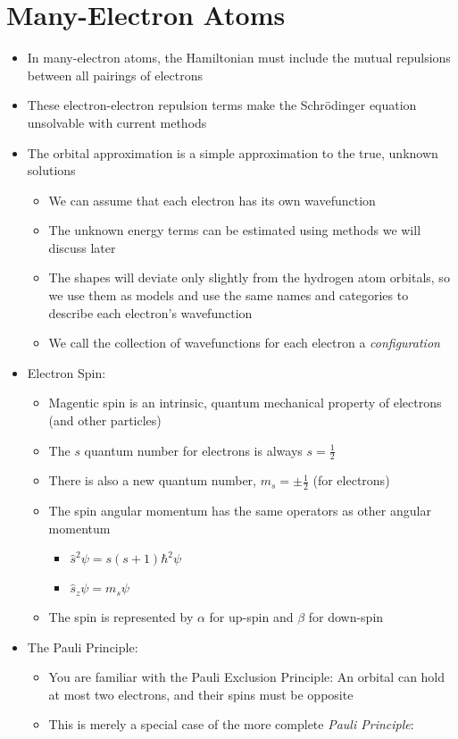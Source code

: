 \documentclass[12pt, openany, letterpaper]{memoir}
\begin{document}
\section{Many-Electron Atoms}
\begin{itemize}
	\item In many-electron atoms, the Hamiltonian must include the mutual repulsions between all pairings of electrons
	\item These electron-electron repulsion terms make the Schr\"odinger equation unsolvable with current methods
	\item The orbital approximation is a simple approximation to the true, unknown solutions
	\begin{itemize}
		\item We can assume that each electron has its own wavefunction
		\item The unknown energy terms can be estimated using methods we will discuss later 
		\item The shapes will deviate only slightly from the hydrogen atom orbitals, so we use them as models and use the same names and categories to describe each electron's wavefunction
		\item We call the collection of wavefunctions for each electron a \emph{configuration}
	\end{itemize}
	\item Electron Spin:
	\begin{itemize}
		\item Magentic spin is an intrinsic, quantum mechanical property of electrons (and other particles)
		\item The $s$ quantum number for electrons is always $s=\frac{1}{2}$
		\item There is also a new quantum number, $m_s=\pm\frac{1}{2}$ (for electrons)
		\item The spin angular momentum has the same operators as other angular momentum
		\begin{itemize}
			\item $\hat{s}^2\psi = s(s+1)\hbar^2\psi$
			\item $\hat{s}_z\psi=m_s\psi$
		\end{itemize}
		\item The spin is represented by $\alpha$ for up-spin and $\beta$ for down-spin
	\end{itemize}
	\item The Pauli Principle:
	\begin{itemize}
		\item You are familiar with the Pauli Exclusion Principle: An orbital can hold at most two electrons, and their spins must be opposite
		\item This is merely a special case of the more complete \emph{Pauli Principle}:
		

\end{itemize}
\end{itemize}
\end{document}
